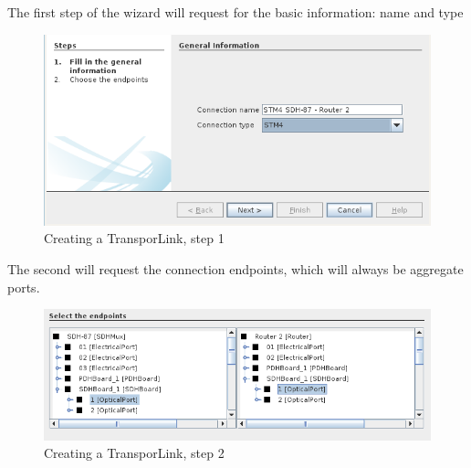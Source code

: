 \documentclass[a4paper]{article}
\begin{document}
		The first step of the wizard will request for the basic information: name and type
		\begin{figure}[h!]
			\centering
			\includegraphics[width=\linewidth]{img/sdh_module_transport_link_step_1.png}
			\caption{Creating a TransporLink, step 1}
			\label{fig:sdh_module_transport_link_step_1}
		\end{figure}
		\newpage
		The second will request the connection endpoints, which will always be aggregate ports.
		\begin{figure}[h!]
			\centering
			\includegraphics[width=\linewidth]{img/sdh_module_transport_link_step_2.png}
			\caption{Creating a TransporLink, step 2}
			\label{fig:sdh_module_transport_link_step_2}
		\end{figure}
		
\end{document}
